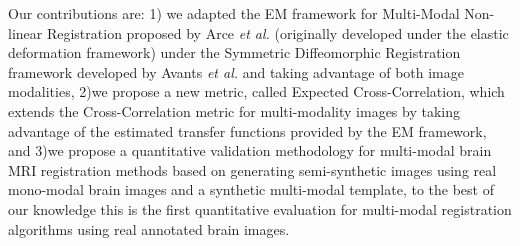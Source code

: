 Our contributions are: 1) we adapted the EM framework for Multi-Modal Non-linear Registration proposed by Arce {\it et al.}\cite{Arce-santana2014} (originally
developed under the elastic deformation framework) under the Symmetric Diffeomorphic Registration framework developed by Avants {\it et al.}\cite{Avants2008}
\cite{Avants2011} and taking advantage of both image modalities, 2)we propose a new metric, called Expected Cross-Correlation, which extends the Cross-Correlation metric for multi-modality images by taking
advantage of the estimated transfer functions provided by the EM framework, and 3)we propose a quantitative validation methodology for multi-modal brain MRI registration methods
based on generating semi-synthetic images using real mono-modal brain images and a synthetic multi-modal template, to the best of our knowledge this is the first
quantitative evaluation for multi-modal registration algorithms using real annotated brain images.\\
